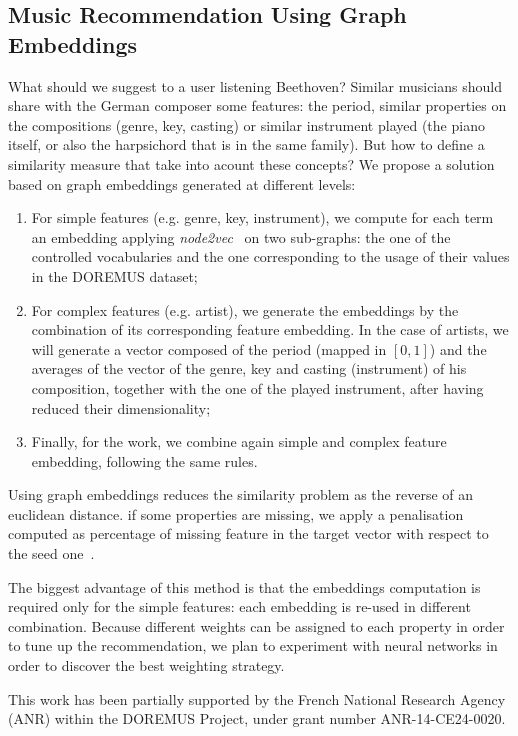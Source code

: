 \subsection{Music Recommendation Using Graph Embeddings}
What should we suggest to a user listening Beethoven? Similar musicians should share with the German composer some features: the period, similar properties on the compositions (genre, key, casting) or similar instrument played (the piano itself, or also the harpsichord that is in the same family). But how to define a similarity measure that take into acount these concepts? We propose a solution based on graph embeddings generated at different levels:
\begin{enumerate}
  \item For simple features (e.g. genre, key, instrument), we compute for each term an embedding applying \textit{node2vec}~\cite{node2vec-kdd2016} on two sub-graphs: the one of the controlled vocabularies and the one corresponding to the usage of their values in the DOREMUS dataset;
  \item For complex features (e.g. artist), we generate the embeddings by the combination of its corresponding feature embedding. In the case of artists, we will generate a vector composed of the period (mapped in $[0,1]$) and the averages of the vector of the genre, key and casting (instrument) of his composition, together with the one of the played instrument, after having reduced their dimensionality;
  \item Finally, for the work, we combine again simple and complex feature embedding, following the same rules.
\end{enumerate}

Using graph embeddings reduces the similarity problem as the reverse of an euclidean distance. if some properties are missing, we apply a penalisation computed as percentage of missing feature in the target vector with respect to the seed one~\cite{lisena2017combining}.

The biggest advantage of this method is that the embeddings computation is required only for the simple features: each embedding is re-used in different combination. Because different weights can be assigned to each property in order to tune up the recommendation, we plan to experiment with neural networks in order to discover the best weighting strategy.

\begin{acks}
This work has been partially supported by the French National Research Agency (ANR) within the DOREMUS Project, under grant number ANR-14-CE24-0020.
\end{acks}
